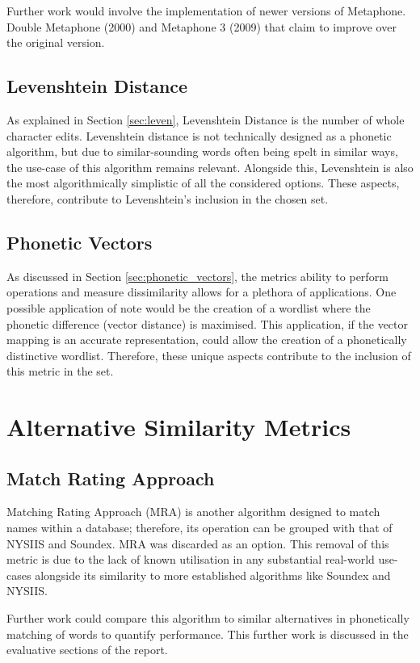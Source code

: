 Further work would involve the implementation of newer versions of Metaphone. Double Metaphone (2000) and
Metaphone 3 (2009) that claim to improve over the original version.

\subsection{Levenshtein Distance}
As explained in Section \ref{sec:leven}, Levenshtein Distance is the number of whole character edits. Levenshtein distance is not technically designed as a phonetic algorithm, but due to similar-sounding words often being spelt in similar ways\cite{hettiarachchi2012sparcl}, the use-case of this algorithm remains relevant. Alongside this, Levenshtein is also the most algorithmically simplistic of all the considered options. These aspects, therefore, contribute to Levenshtein's inclusion in the chosen set.

\subsection{Phonetic Vectors}
As discussed in Section \ref{sec:phonetic_vectors}, the metrics ability to perform operations and measure dissimilarity allows for a plethora of applications. One possible application of note would be the creation of a wordlist where the phonetic difference (vector distance) is maximised. This application, if the vector mapping is an accurate representation, could allow the creation of a phonetically distinctive wordlist. Therefore, these unique aspects contribute to the inclusion of this metric in the set.

\section{Alternative Similarity Metrics}

\subsection{Match Rating Approach}
Matching Rating Approach (MRA) is another algorithm designed to match names within a database; therefore, its operation can be grouped with that of NYSIIS and Soundex. MRA was discarded as an option. This removal of this metric is due to the lack of known utilisation in any substantial real-world use-cases alongside its similarity to  more established algorithms like Soundex and NYSIIS.

Further work could compare this algorithm to similar alternatives in phonetically matching of words to quantify performance. This further work is discussed in the evaluative sections of the report.

